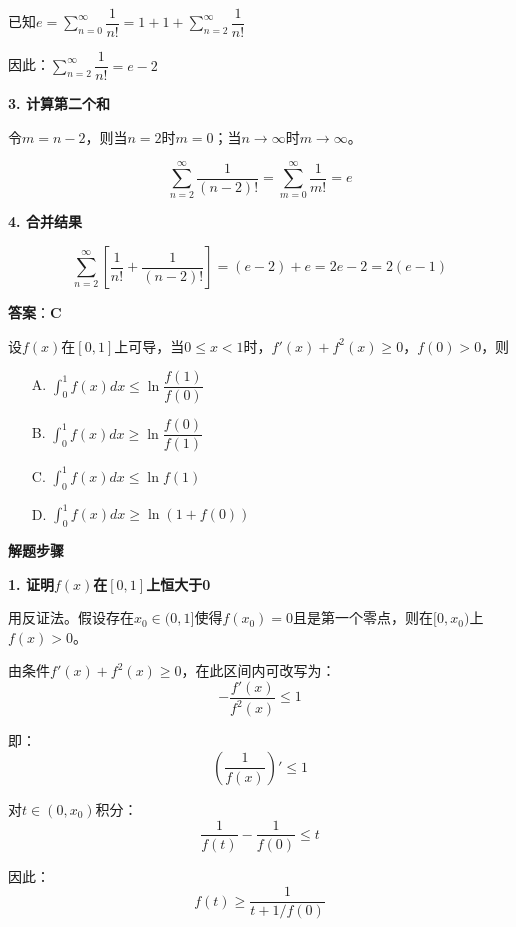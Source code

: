 \documentclass[standard]{ExBook}
\begin{document}
\begin{qitems}
\begin{bbox}
\begin{solution}
            已知$e = \sum\limits_{n=0}^{\infty} \dfrac{1}{n!} = 1 + 1 + \sum\limits_{n=2}^{\infty} \dfrac{1}{n!}$
            
            因此：$\sum\limits_{n=2}^{\infty} \dfrac{1}{n!} = e - 2$
            
            \textbf{3. 计算第二个和}
            
            令$m = n-2$，则当$n=2$时$m=0$；当$n \to \infty$时$m \to \infty$。
            
            $$\sum_{n=2}^{\infty} \frac{1}{(n-2)!} = \sum_{m=0}^{\infty} \frac{1}{m!} = e$$
            
            \textbf{4. 合并结果}
            
            $$\sum_{n=2}^{\infty} \left[\frac{1}{n!} + \frac{1}{(n-2)!}\right] = (e-2) + e = 2e - 2 = 2(e-1)$$
            
            \textbf{答案}：\textbf{C}
        \end{solution}
    \end{bbox}

    \begin{bbox}
        \qitem 设$f(x)$在$[0,1]$上可导，当$0 \le x < 1$时，$f'(x)+f^2(x) \ge 0$，$f(0)>0$，则
        \begin{itemize}
            \item[A.] $\int_0^1 f(x)dx \le \ln\dfrac{f(1)}{f(0)}$
            \item[B.] $\int_0^1 f(x)dx \ge \ln\dfrac{f(0)}{f(1)}$
            \item[C.] $\int_0^1 f(x)dx \le \ln f(1)$
            \item[D.] $\int_0^1 f(x)dx \ge \ln(1+f(0))$
        \end{itemize}
        \begin{solution}
            \textbf{解题步骤}
            
            \textbf{1. 证明$f(x)$在$[0,1]$上恒大于0}
            
            用反证法。假设存在$x_0 \in (0,1]$使得$f(x_0)=0$且是第一个零点，则在$[0, x_0)$上$f(x)>0$。
            
            由条件$f'(x)+f^2(x) \ge 0$，在此区间内可改写为：
            $$-\frac{f'(x)}{f^2(x)} \le 1$$
            
            即：$$\left(\frac{1}{f(x)}\right)' \le 1$$
            
            对$t \in (0, x_0)$积分：
            $$\frac{1}{f(t)} - \frac{1}{f(0)} \le t$$
            
            因此：$$f(t) \ge \frac{1}{t+1/f(0)}$$
            

\end{solution}
\end{bbox}
\end{qitems}
\end{document}
